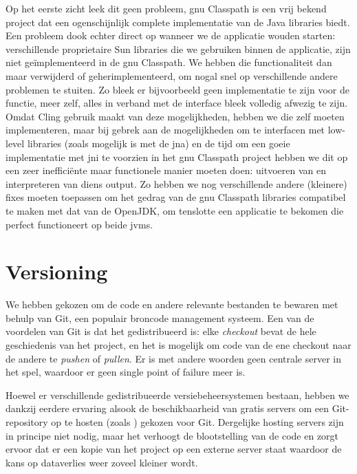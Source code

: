 Op het eerste zicht leek dit geen probleem, \acs{gnu} Classpath is een vrij bekend project dat een ogenschijnlijk complete implementatie van de Java libraries biedt. Een probleem dook echter direct op wanneer we de applicatie wouden starten: verschillende proprietaire Sun libraries die we gebruiken binnen de applicatie, zijn niet geïmplementeerd in de \acs{gnu} Classpath. We hebben die functionaliteit dan maar verwijderd of geherimplementeerd, om nogal snel op verschillende andere problemen te stuiten. Zo bleek er bijvoorbeeld geen implementatie te zijn voor de  functie, meer zelf, alles in verband met de  interface bleek volledig afwezig te zijn. Omdat Cling gebruik maakt van deze mogelijkheden, hebben we die zelf moeten implementeren, maar bij gebrek aan de mogelijkheden om te interfacen met low-level libraries (zoals mogelijk is met de \ac{jna}) en de tijd om een goeie implementatie met \ac{jni} te voorzien in het \acs{gnu} Classpath project hebben we dit op een zeer inefficiënte maar functionele manier moeten doen: uitvoeren van  en interpreteren van diens output.
Zo hebben we nog verschillende andere (kleinere) fixes moeten toepassen om het gedrag van de \acs{gnu} Classpath libraries compatibel te maken met dat van de OpenJDK, om tenslotte een applicatie te bekomen die perfect functioneert op beide \acp{jvm}.

\section{Versioning}
\label{server:deployment:versioning}

We hebben gekozen om de code en andere relevante bestanden te bewaren met behulp van Git, een populair broncode management systeem. Een van de voordelen van Git is dat het gedistribueerd is: elke \emph{checkout} bevat de hele geschiedenis van het project, en het is mogelijk om code van de ene checkout naar de andere te \emph{pushen} of \emph{pullen}. Er is met andere woorden geen centrale server in het spel, waardoor er geen single point of failure meer is.

Hoewel er verschillende gedistribueerde versiebeheersystemen bestaan, hebben we dankzij eerdere ervaring alsook de beschikbaarheid van gratis servers om een Git-repository op te hosten (zoals ) gekozen voor Git. Dergelijke hosting servers zijn in principe niet nodig, maar het verhoogt de blootstelling van de code en zorgt ervoor dat er een kopie van het project op een externe server staat waardoor de kans op dataverlies weer zoveel kleiner wordt.

